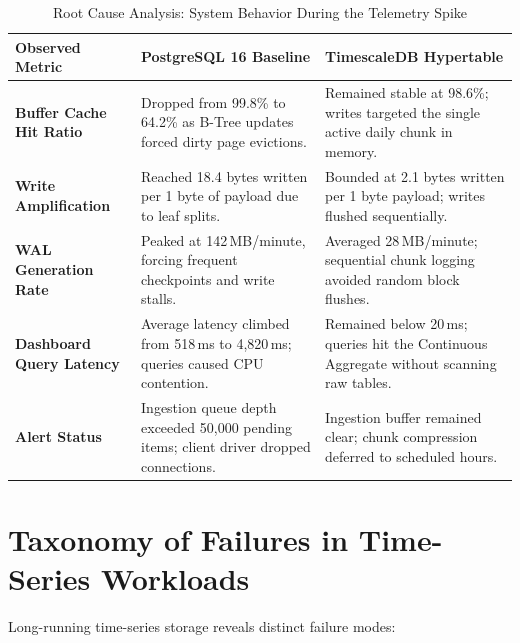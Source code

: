 \documentclass[conference,a4paper]{IEEEtran}
\begin{document}
\begin{table}[t]
\caption{Root Cause Analysis: System Behavior During the Telemetry Spike}
\label{tab:incident_rca}
\centering
\footnotesize
\begin{tabularx}{\textwidth}{@{}p{3.8cm}XX@{}}
\toprule
\textbf{Observed Metric} & \textbf{PostgreSQL 16 Baseline} & \textbf{TimescaleDB Hypertable} \\ \midrule
\textbf{Buffer Cache Hit Ratio} & Dropped from 99.8\% to 64.2\% as B-Tree updates forced dirty page evictions. & Remained stable at 98.6\%; writes targeted the single active daily chunk in memory. \\ \addlinespace[0.4ex]
\textbf{Write Amplification} & Reached 18.4 bytes written per 1 byte of payload due to leaf splits. & Bounded at 2.1 bytes written per 1 byte payload; writes flushed sequentially. \\ \addlinespace[0.4ex]
\textbf{WAL Generation Rate} & Peaked at 142\,MB/minute, forcing frequent checkpoints and write stalls. & Averaged 28\,MB/minute; sequential chunk logging avoided random block flushes. \\ \addlinespace[0.4ex]
\textbf{Dashboard Query Latency} & Average latency climbed from 518\,ms to 4,820\,ms; queries caused CPU contention. & Remained below 20\,ms; queries hit the Continuous Aggregate without scanning raw tables. \\ \addlinespace[0.4ex]
\textbf{Alert Status} & Ingestion queue depth exceeded 50,000 pending items; client driver dropped connections. & Ingestion buffer remained clear; chunk compression deferred to scheduled hours. \\ \bottomrule
\end{tabularx}
\end{table}

\section{Taxonomy of Failures in Time-Series Workloads}
Long-running time-series storage reveals distinct failure modes:
\end{document}

